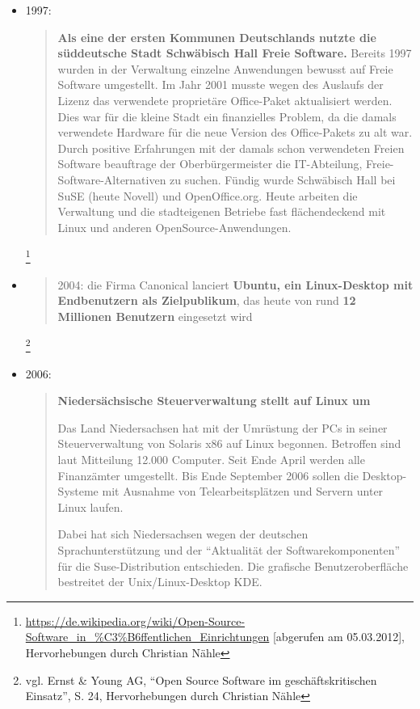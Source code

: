 \documentclass[a4paper]{scrartcl}
\begin{document}
\begin{itemize}
\item 1997: \begin{quote}\textbf{Als eine der ersten Kommunen Deutschlands
      nutzte die süddeutsche Stadt Schwäbisch Hall Freie Software.}  Bereits
    1997 wurden in der Verwaltung einzelne Anwendungen bewusst auf Freie
    Software umgestellt. Im Jahr 2001 musste wegen des Auslaufs der Lizenz das
    verwendete proprietäre Office-Paket aktualisiert werden.  Dies war für die
    kleine Stadt ein finanzielles Problem, da die damals verwendete Hardware für
    die neue Version des Office-Pakets zu alt war. Durch positive Erfahrungen
    mit der damals schon verwendeten Freien Software beauftrage der
    Oberbürgermeister die IT-Abteilung, Freie-Software-Alternativen zu
    suchen. Fündig wurde Schwäbisch Hall bei SuSE (heute Novell) und
    OpenOffice.org. Heute arbeiten die Verwaltung und die stadteigenen Betriebe
    fast flächendeckend mit Linux und anderen OpenSource-Anwendungen.
\end{quote}\footnote{\href{https://de.wikipedia.org/wiki/Open-Source-Software_in_?ffentlichen_Einrichtungen}{https://de.wikipedia.org/wiki/Open-Source-Software\_in\_\%C3\%B6ffentlichen\_Einrichtungen}
[abgerufen am 05.03.2012], Hervorhebungen durch Christian Nähle}

\item \begin{quote}2004: die Firma Canonical lanciert \textbf{Ubuntu, ein
      Linux-Desktop mit Endbenutzern als Zielpublikum}, das heute von rund
    \textbf{12 Millionen Benutzern} eingesetzt
    wird\end{quote}\footnote{vgl. Ernst \& Young AG, ``Open Source Software im
    geschäftskritischen Einsatz'', S. 24, Hervorhebungen durch Christian Nähle}

\item 2006: \begin{quotation}\textbf{Niedersächsische Steuerverwaltung
stellt auf Linux um}

Das Land Niedersachsen hat mit der Umrüstung der PCs in seiner Steuerverwaltung
von Solaris x86 auf Linux begonnen. Betroffen sind laut Mitteilung 12.000
Computer. Seit Ende April werden alle Finanzämter umgestellt. Bis Ende September
2006 sollen die Desktop-Systeme mit Ausnahme von Telearbeitsplätzen und Servern
unter Linux laufen.

Dabei hat sich Niedersachsen wegen der deutschen Sprachunterstützung und der
``Aktualität der Softwarekomponenten'' für die Suse-Distribution
entschieden. Die grafische Benutzeroberfläche bestreitet der Unix/Linux-Desktop
KDE.


\end{quotation}
\end{itemize}
\end{document}
